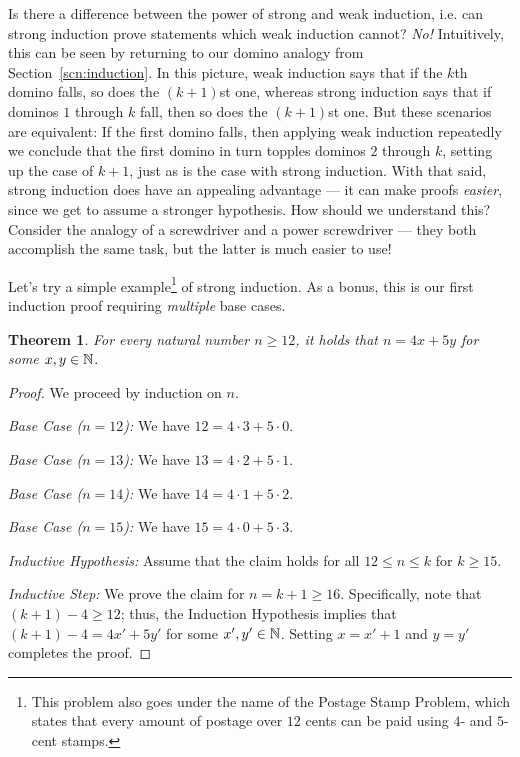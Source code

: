 \documentclass[11pt]{article}
\newcounter{thm}
\newtheorem{theorem}{Theorem}[thm]
\begin{document}
Is there a difference between the power of strong and weak induction, i.e. can strong induction prove statements which weak induction cannot? \emph{No!} Intuitively, this can be seen by returning to our domino analogy from Section~\ref{scn:induction}. In this picture, weak induction says that if the $k$th domino falls, so does the $(k+1)$st one, whereas strong induction says that if dominos $1$ through $k$ fall, then so does the $(k+1)$st one. But these scenarios are equivalent: If the first domino falls, then applying weak induction repeatedly we conclude that the first domino in turn topples dominos $2$ through $k$, setting up the case of $k+1$, just as is the case with strong induction. With that said, strong induction does have an appealing advantage --- it can make proofs \emph{easier}, since we get to assume a stronger
hypothesis. How should we understand this? Consider the analogy of a screwdriver and a power screwdriver --- they both accomplish the same task, but the latter is much easier to use!

Let's try a simple example\footnote{This problem also goes under the name of the Postage Stamp Problem, which states that every amount of postage over $12$ cents can be paid using $4$- and $5$-cent stamps.} of strong induction. As a bonus, this is our first induction proof requiring \emph{multiple} base cases.
\begin{theorem}\label{thm:sumeven}
    For every natural number $n\geq 12$, it holds that $n=4x+5y$ for some $x,y\in\mathbb{N}$.
\end{theorem}
\begin{proof}
We proceed by induction on $n$.

\emph{Base Case ($n = 12$):} We have $12=4\cdot 3+5\cdot 0$.

\emph{Base Case ($n = 13$):} We have $13=4\cdot 2+5\cdot 1$.

\emph{Base Case ($n = 14$):} We have $14=4\cdot 1+5\cdot 2$.

\emph{Base Case ($n = 15$):} We have $15=4\cdot 0+5\cdot 3$.

\emph{Inductive Hypothesis:} Assume that the claim holds for all $12\leq n\leq k$ for $k\geq 15$.

\emph{Inductive Step:} We prove the claim for $n=k+1\geq 16$. Specifically, note that $(k+1)-4\geq 12$; thus, the Induction Hypothesis implies that $(k+1)-4=4x'+5y'$ for some $x',y'\in\mathbb{N}$. Setting $x=x'+1$ and $y=y'$ completes the proof.
\end{proof}
\end{document}

